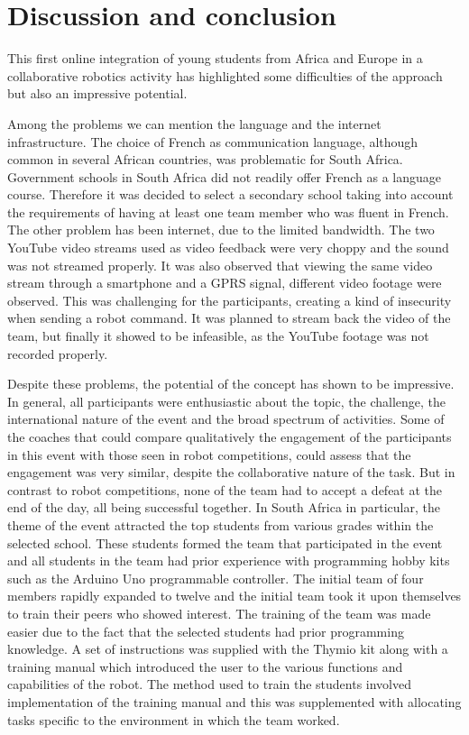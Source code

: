 \documentclass{intech-journal}
\begin{document}
\section{Discussion and conclusion}

This first online integration of young students from Africa and Europe in a collaborative robotics activity has highlighted some difficulties of the approach but also an impressive potential.

Among the problems we can mention the language and the internet infrastructure.
The choice of French as communication language, although common in several African countries, was problematic for South Africa.
Government schools in South Africa did not readily offer French as a language course.
Therefore it was decided to select a secondary school taking into account the requirements of having at least one team member who was fluent in French. 
The other problem has been internet, due to the limited bandwidth. 
The two YouTube video streams used as video feedback were very choppy and the sound was not streamed properly.
It was also observed that viewing the same video stream through a smartphone and a GPRS signal, different video footage were observed. 
This was challenging for the participants, creating a kind of insecurity when sending a robot command.
It was planned to stream back the video of the team, but finally it showed to be infeasible, as the YouTube footage was not recorded properly.

Despite these problems, the potential of the concept has shown to be impressive.
In general, all participants were enthusiastic about the topic, the challenge, the international nature of the event and the broad spectrum of activities. 
Some of the coaches that could compare qualitatively the engagement of the participants in this event with those seen in robot competitions, could assess that the engagement was very similar, despite the collaborative nature of the task. 
But in contrast to robot competitions, none of the team had to accept a defeat at the end of the day, all being successful together. 
In South Africa in particular, the theme of the event attracted the top students from various grades within the selected school. 
These students formed the team that participated in the event and all students in the team had prior experience with programming hobby kits such as the Arduino Uno programmable controller. 
The initial team of four members rapidly expanded to twelve and the initial team took it upon themselves to train their peers who showed interest. 
The training of the team was made easier due to the fact that the selected students had prior programming knowledge. 
A set of instructions was supplied with the Thymio kit along with a training manual which introduced the user to the various functions and capabilities of the robot. 
The method used to train the students involved implementation of the training manual and this was supplemented with allocating tasks specific to the environment in which the team worked. 
\end{document}
